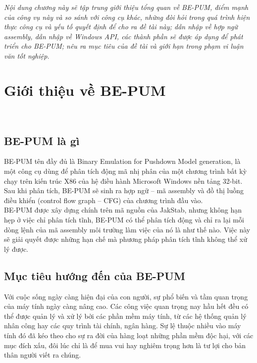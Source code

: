 
\begin{concept}[15cm]
\textit{Nội dung chương này sẽ tập trung giới thiệu tổng quan về BE-PUM, điểm mạnh của công vụ này và so sánh với công cụ khác, những đòi hỏi trong quá trình hiện thực công cụ và yếu tố quyết  định để cho ra đề tài này; dẫn nhập về hợp ngữ assembly, dẫn nhập về Windows API, các thành phần sẽ được áp dụng để phát triển cho BE-PUM; nêu ra mục tiêu của đề tài và giới hạn trong phạm vi luận văn tốt nghiệp.}
\end{concept}

\section{Giới thiệu về BE-PUM}\

	\subsection{BE-PUM là gì}

BE-PUM tên đầy đủ là Binary Emulation for Pushdown Model generation, là một công cụ dùng để phân tích động mã nhị phân của một chương trình bất kỳ chạy trên kiến trúc X86 của hệ điều hành Microsoft Windows nền tảng 32-bit. Sau khi phân tích, BE-PUM sẽ sinh ra hợp ngữ – mã assembly và đồ thị luồng điều khiển (control flow graph – CFG) của chương trình đầu vào.\\

BE-PUM được xây dựng chính trên mã nguồn của JakStab, nhưng không hạn hẹp ở việc chỉ phân tích tĩnh, BE-PUM có thể phân tích động và chỉ ra lại mỗi dòng lệnh của mã assembly môi trường làm việc của nó là như thế nào. Việc này sẽ giải quyết được những hạn chế mà phương pháp phân tích tĩnh không thể xử lý được.

	\subsection{Mục tiêu hướng đến của BE-PUM}

Với cuộc sống ngày càng hiện đại của con người, sự phổ biến và tầm quan trọng của máy tính ngày càng nâng cao. Các công việc quan trọng nay hầu hết đều có thể được quản lý và xử lý bởi các phần mềm máy tính, từ các hệ thống quản lý nhân công hay các quy trình tài chính, ngân hàng. Sự lệ thuộc nhiều vào máy tính đó đã kéo theo cho sự ra đời của hàng loạt những phần mềm độc hại, với các mục đích xấu, đôi lúc chỉ là để mua vui hay nghiêm trọng hơn là tư lợi cho bản thân người viết ra chúng. \\


